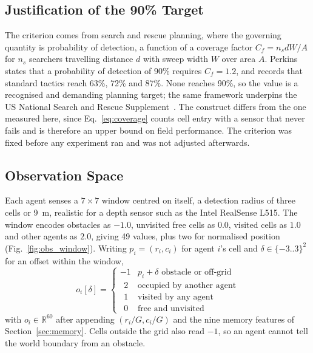 \documentclass[a4paper, 10pt, conference]{ieeeconf}
\begin{document}
\subsection{Justification of the 90\% Target}\label{sec:threshold}

The criterion comes from search and rescue planning, where the
governing quantity is probability of detection, a function of a
coverage factor $C_{f} = n_{s}dW/A$ for $n_s$ searchers travelling
distance $d$ with sweep width $W$ over area $A$.
Perkins~\cite{perkins2013} states that a probability of detection of
90\% requires $C_f = 1.2$, and records that standard tactics reach
63\%, 72\% and 87\%. None reaches 90\%, so the value is a recognised
and demanding planning target; the same framework underpins the US
National Search and Rescue Supplement~\cite{nss2018}. The construct
differs from the one measured here, since Eq.~\ref{eq:coverage} counts
cell entry with a sensor that never fails and is therefore an upper
bound on field performance. The criterion was fixed before any
experiment ran and was not adjusted afterwards.

\subsection{Observation Space}\label{sec:obs}

Each agent senses a $7\times7$ window centred on itself, a detection
radius of three cells or 9~m, realistic for a depth sensor such as the
Intel RealSense L515. The window encodes obstacles as $-1.0$,
unvisited free cells as $0.0$, visited cells as $1.0$ and other agents
as $2.0$, giving 49 values, plus two for normalised position
(Fig.~\ref{fig:obs_window}). Writing $p_i=(r_i,c_i)$ for agent $i$'s
cell and $\delta\in\{-3..3\}^2$ for an offset within the window,
\begin{equation}\label{eq:obs}
o_i[\delta]=
\begin{cases}
-1 & p_i{+}\delta \text{ obstacle or off-grid}\\
\;\,2 & \text{occupied by another agent}\\
\;\,1 & \text{visited by any agent}\\
\;\,0 & \text{free and unvisited}
\end{cases}
\end{equation}
with $o_i \in \mathbb{R}^{60}$ after appending $(r_i/G, c_i/G)$ and
the nine memory features of Section~\ref{sec:memory}. Cells outside
the grid also read $-1$, so an agent cannot tell the world boundary
from an obstacle.
\end{document}
